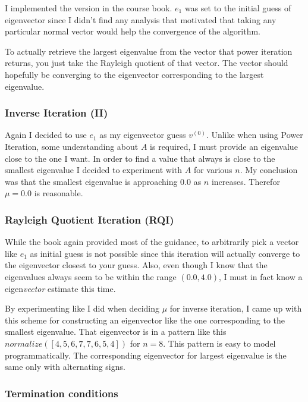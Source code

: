 \documentclass[a4paper,11pt]{article}
\begin{document}
I implemented the version in the course book.  $e_1$ was set to the
initial guess of eigenvector since I didn't find any analysis that
motivated that taking any particular normal vector would help the
convergence of the algorithm.

To actually retrieve the largest eigenvalue from the vector that power
iteration returns, you just take the Rayleigh quotient of that vector.
The vector should hopefully be converging to the eigenvector
corresponding to the largest eigenvalue.

\subsubsection{Inverse Iteration (II)}

Again I decided to use $e_1$ as my eigenvector guess $v^{(0)}$.  Unlike
when using Power Iteration, some understanding about $A$ is required, I
must provide an eigenvalue close to the one I want. In order to find a
value that always is close to the smallest eigenvalue I decided to
experiment with $A$ for various $n$. My conclusion was that the smallest
eigenvalue is approaching $0.0$ as $n$ increases. Therefor $\mu=0.0$ is
reasonable.

\subsubsection{Rayleigh Quotient Iteration (RQI)}

While the book again provided most of the guidance, to arbitrarily pick
a vector like $e_1$ as initial guess is not possible since this
iteration will actually converge to the eigenvector closest to your
guess. Also, even though I know that the eigenvalues always seem to be
within the range $(0.0, 4.0)$, I must in fact know a
eigen\emph{vector} estimate this time.

By experimenting like I did when deciding $\mu$ for inverse iteration, I
came up with this scheme for constructing an eigenvector like the one
corresponding to the smallest eigenvalue. That eigenvector is in a
pattern like this $normalize([4, 5, 6, 7, 7, 6, 5, 4])$ for $n=8$.  This
pattern is easy to model programmatically. The corresponding eigenvector
for largest eigenvalue is the same only with alternating signs.

\subsubsection{Termination conditions}
\end{document}
